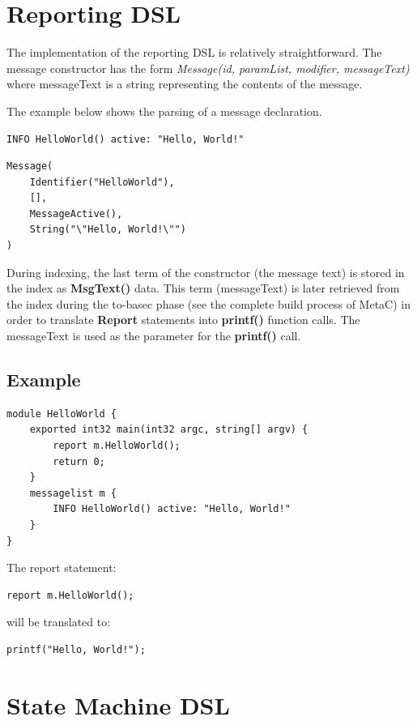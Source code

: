 \documentclass[a4paper,10pt,titlepage]{report}
\begin{document}
\chapter{Reporting DSL}
The implementation of the reporting DSL is relatively straightforward. The message constructor has the form \emph{Message(id, paramList, modifier, messageText)} where messageText is a string representing the contents of the message. 

The example below shows the parsing of a message declaration.

\begin{lstlisting}
INFO HelloWorld() active: "Hello, World!"
\end{lstlisting}

\begin{lstlisting}
Message(
    Identifier("HelloWorld"), 
    [], 
    MessageActive(), 
    String("\"Hello, World!\"")
)
\end{lstlisting}

During indexing, the last term of the constructor (the message text) is stored in the index as \textbf{MsgText()} data. This term (messageText) is later retrieved from the index during the to-basec phase (see the complete build process of MetaC) in order to translate \textbf{Report} statements into \textbf{printf()} function calls. The messageText is used as the parameter for the \textbf{printf()} call.

\section{Example}
\begin{lstlisting}
module HelloWorld { 
    exported int32 main(int32 argc, string[] argv) { 
        report m.HelloWorld(); 
        return 0;
    }
    messagelist m { 
        INFO HelloWorld() active: "Hello, World!"
    }
}
\end{lstlisting}

\newpage
{\setlength{\parindent}{0cm}
The report statement: 
}
\begin{lstlisting}
report m.HelloWorld(); 
\end{lstlisting}
{\setlength{\parindent}{0cm}
will be translated to:
}
\begin{lstlisting}
printf("Hello, World!");
\end{lstlisting}


\chapter{State Machine DSL}
\end{document}
